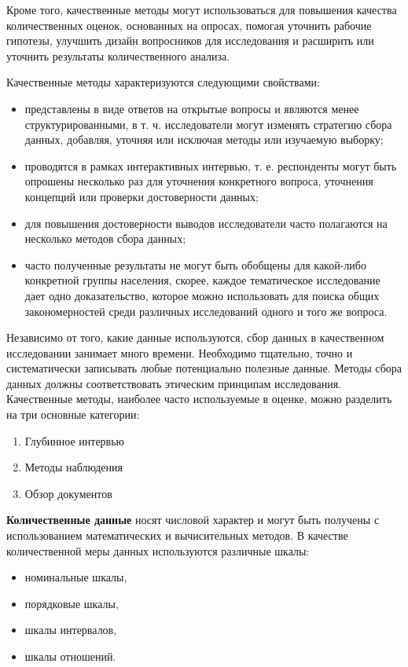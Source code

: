 \documentclass[12pt,a4paper, oneside]{extreport}
\begin{document}
Кроме того, качественные методы могут использоваться для повышения качества количественных оценок, основанных на опросах, помогая уточнить рабочие гипотезы,  улучшить  дизайн вопросников для исследования и расширить  или уточнить  результаты  количественного анализа. 

Качественные методы характеризуются следующими свойствами:

\begin{itemize}
	\item представлены в виде  ответов на  открытые  вопросы и являются менее структурированными, в т. ч.  исследователи могут изменять стратегию сбора данных, добавляя, уточняя или исключая методы или изучаемую выборку; 
	\item проводятся в рамках интерактивных интервью, т. е.  респонденты могут быть опрошены несколько раз для уточнения конкретного вопроса, уточнения концепций или проверки достоверности данных; 
	\item  для повышения достоверности выводов исследователи часто полагаются на несколько методов сбора данных; 
	\item  часто полученные результаты не могут быть обобщены для какой-либо конкретной группы населения, скорее, каждое тематическое исследование дает одно доказательство, которое можно использовать для поиска общих закономерностей среди различных исследований одного и того же вопроса.
\end{itemize} 


Независимо от того, какие данные используются, сбор данных в качественном исследовании занимает много времени. Необходимо тщательно, точно и систематически записывать любые потенциально полезные данные. Методы сбора данных должны соответствовать этическим принципам исследования. Качественные методы, наиболее часто используемые в оценке, можно разделить на три основные категории: 

\begin{enumerate}
	\item Глубинное интервью 
	\item Методы наблюдения 
	\item Обзор документов
\end{enumerate}


\textbf{Количественные данные} носят числовой характер и могут быть получены с использованием математических и вычисительных методов. В качестве количественной меры данных используются  различные шкалы:

\begin{itemize}
	\item  номинальные шкалы, 
	\item  порядковые шкалы, 
	\item шкалы интервалов, 
	\item  шкалы отношений.
\end{itemize}
\end{document}
